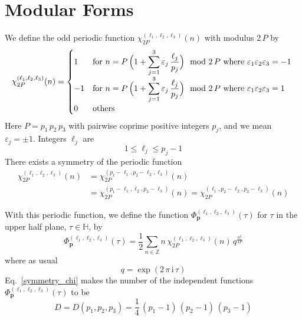 \documentclass[12pt,reqno]{amsart}
\numberwithin{equation}{section}
\begin{document}
\section{Modular Forms}
\label{sec:modular}

We define the odd periodic function
$\chi_{2 P}^{(\ell_1, \ell_2 ,  \ell_3)}(n)$
with modulus $2 \, P$
by
\begin{equation}
  \label{define_chi}
  \chi_{2 P}^{(\ell_1, \ell_2 ,  \ell_3)}(n)
  =
  \begin{cases}
    1 &
    \text{for
      $\displaystyle
      n=
      P \,
      \Bigl(
        1 + \sum_{j=1}^3 \varepsilon_j \, \frac{\ell_j}{p_j}
      \Bigr)
      \mod 2 \, P
      $
      where
      $\varepsilon_1 \varepsilon_2 \varepsilon_3=-1$
    }
    \\[2mm]
    -1 &
    \text{for
      $\displaystyle
      n=
      P \, 
      \Bigl(
        1 + \sum_{j=1}^3 \varepsilon_j \, \frac{\ell_j}{p_j}
      \Bigr)
      \mod 2 \, P
      $
      where
      $\varepsilon_1 \varepsilon_2 \varepsilon_3= 1$
    }
    \\[2mm]
    0 &
    \text{others}
  \end{cases}
\end{equation}
Here
$P=p_1 \, p_2 \, p_3$ with pairwise coprime positive integers $p_j$,
and
we mean $\varepsilon_j = \pm 1$.
Integers  $\ell_j$ are 
\begin{equation}
  \label{define_ell}
  1 \leq \ell_j \leq p_j - 1
\end{equation}
There exists a symmetry  of the periodic function
\begin{align}
  \chi_{2 P}^{(\ell_1, \ell_2, \ell_3)}(n)
  & =
  \chi_{2 P}^{(p_1-\ell_1, p_2 - \ell_2, \ell_3)}(n)
  \nonumber
  \\
  & =
  \chi_{2 P}^{(p_1-\ell_1, \ell_2, p_3 - \ell_3)}(n)
  =
  \chi_{2 P}^{(\ell_1, p_2 - \ell_2, p_3 - \ell_3)}(n)
  \label{symmetry_chi}
\end{align}

With this periodic function, we define the function
$  \Phi_{\boldsymbol{p}}^{(\ell_1, \ell_2, \ell_3)}(\tau)$
for $\tau$  in the upper half plane,
$\tau \in \mathbb{H}$,  by
\begin{equation}
  \label{modular_Phi}
  \Phi_{\boldsymbol{p}}^{(\ell_1, \ell_2, \ell_3)}(\tau)
  =
  \frac{1}{2}
  \sum_{n \in \mathbb{Z}}
  n \,
  \chi_{2 P}^{(\ell_1, \ell_2, \ell_3)}(n)
  \,
  q^{\frac{n^2}{4 P}}
\end{equation}
where  as usual 
\begin{equation*}
  q=\exp(2 \, \pi \, \mathrm{i} \, \tau)
\end{equation*}
Eq.~\eqref{symmetry_chi}
makes the number of the independent
functions $\Phi_{\boldsymbol{p}}^{(\ell_1, \ell_2, \ell_3)}(\tau)$
to be
\begin{equation}
  D
  =
  D(p_1, p_2, p_3)
  =\frac{1}{4} \,
  (p_1 - 1) \,   (p_2 - 1) \,   (p_3- 1) 
\end{equation}
\end{document}
